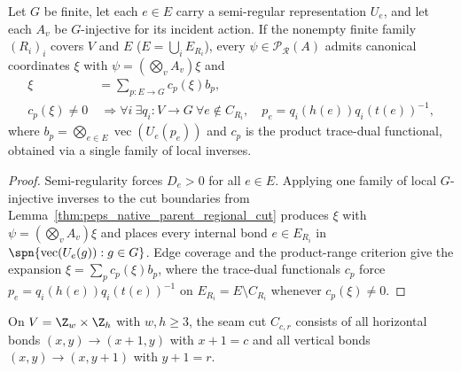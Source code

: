 \begin{lemma}%
    \label{thm:peps_native_parent_coefficients}
    \leanok
    Let $G$ be finite, let each $e\in E$ carry a semi-regular representation
    $U_e$, and let each $A_v$ be $G$-injective for its incident action. If the
    nonempty finite family $(R_i)_i$ covers $V$ and $E$ ($E=\bigcup_i E_{R_i}$),
    every $\psi\in\mathcal P_{\mathcal R}(A)$ admits canonical coordinates
    $\xi$ with $\psi=(\bigotimes_v A_v)\xi$ and
    \begin{align}
        \xi          & =\sum_{p:E\to G}c_p(\xi)b_p,\nonumber \\
        c_p(\xi)\ne0 & \ \Longrightarrow
        \forall i\ \exists q_i:V\to G\ \forall e\notin C_{R_i},\quad
        p_e=q_i(h(e))q_i(t(e))^{-1},
        \label{eq:peps_native_parent_coefficients}
    \end{align}
    where $b_p=\bigotimes_{e\in E}\operatorname{vec}(U_e(p_e))$ and $c_p$ is
    the product trace-dual functional, obtained via a single family of local
    inverses.
\end{lemma}
\begin{proof}\leanok
    Semi-regularity forces $D_e>0$ for all $e\in E$. Applying one family of
    local $G$-injective inverses to the cut boundaries from
    Lemma~\ref{thm:peps_native_parent_regional_cut} produces $\xi$ with
    $\psi=(\bigotimes_v A_v)\xi$ and places every internal bond $e\in E_{R_i}$
    in $\spn\{\operatorname{vec}(U_e(g)):g\in G\}$. Edge coverage and the
    product-range criterion give the expansion $\xi=\sum_p c_p(\xi)b_p$, where
    the trace-dual functionals $c_p$ force $p_e=q_i(h(e))q_i(t(e))^{-1}$ on
    $E_{R_i}=E\setminus C_{R_i}$ whenever $c_p(\xi)\ne 0$.
\end{proof}

\begin{definition}%
    \label{def:peps_native_graph_seams}
    \leanok
    On $V=\Z_w\times\Z_h$ with $w,h\geq3$, the seam cut $C_{c,r}$ consists of
    all horizontal bonds $(x,y)\to(x+1,y)$ with $x+1=c$ and all vertical bonds
    $(x,y)\to(x,y+1)$ with $y+1=r$.
\end{definition}

